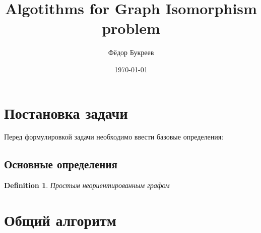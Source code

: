 \documentclass[fleqn]{article}
\title{Algotithms for Graph Isomorphism problem}
\author{Фёдор Букреев}
\date{\today}
\newtheorem{definition}{Definition}
\begin{document}
\maketitle
\tableofcontents

\section{Постановка задачи}
Перед формулировкой задачи необходимо ввести базовые определения:
\subsection{Основные определения}
\begin{definition}
    Простым неориентированным графом
\end{definition}



\section{Общий алгоритм}


\end{document}
